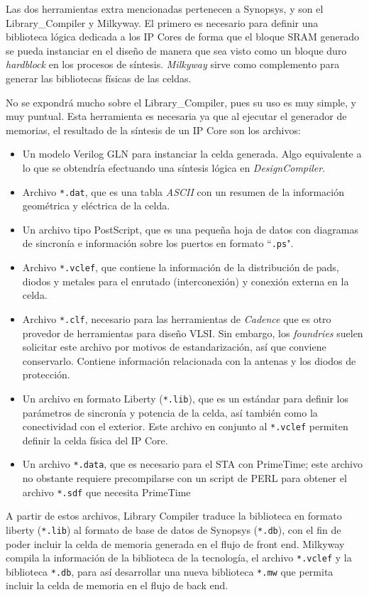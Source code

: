 Las dos herramientas extra mencionadas pertenecen a Synopsys, y son el Library\_Compiler y Milkyway. El primero es necesario para definir una biblioteca lógica dedicada a los IP Cores de forma que el bloque SRAM generado se pueda instanciar en el diseño de manera que sea visto como un bloque duro \textit{hardblock} en los procesos de síntesis. \textit{Milkyway} sirve como complemento para generar las bibliotecas físicas de las celdas.

No se expondrá mucho sobre el Library\_Compiler, pues su uso es muy simple, y muy puntual. Esta herramienta es necesaria ya que al ejecutar el generador de memorias, el resultado de la síntesis de un IP Core son los archivos:
\begin{itemize}
\item Un modelo Verilog GLN para instanciar la celda generada. Algo equivalente a lo que se obtendría efectuando una síntesis lógica en \textit{DesignCompiler}.
\item Archivo \texttt{*.dat}, que es una tabla \textit{ASCII} con un resumen de la información geométrica y eléctrica de la celda.
\item Un archivo tipo PostScript, que es una pequeña hoja de datos con diagramas de sincronía e información sobre los puertos en formato ``\texttt{.ps}".
\item Archivo \texttt{*.vclef}, que contiene la información de la distribución de pads, diodos y metales para el enrutado (interconexión) y conexión externa en la celda.
\item Archivo \texttt{*.clf}, necesario para las herramientas de \textit{Cadence} que es otro provedor de herramientas para diseño VLSI.  Sin embargo, los \textit{foundries} suelen solicitar este archivo por motivos de estandarización, así que conviene conservarlo. Contiene información relacionada con la antenas y los diodos de protección.
\item Un archivo en formato Liberty (\texttt{*.lib}), que es un estándar para definir los parámetros de sincronía y potencia de la celda, así también como la conectividad con el exterior. Este archivo en conjunto al \texttt{*.vclef} permiten definir la celda física del IP Core.
\item Un archivo \texttt{*.data}, que es necesario para el STA con PrimeTime; este archivo no obstante requiere precompilarse con un script de PERL para obtener el archivo \texttt{*.sdf} que necesita PrimeTime
\end{itemize}

A partir de estos archivos, Library Compiler traduce la biblioteca en formato liberty (\texttt{*.lib}) al formato de base de datos de Synopsys (\texttt{*.db}), con el fin de poder incluir la celda de memoria generada en el flujo de front end. Milkyway compila la información de la biblioteca de la tecnología, el archivo \texttt{*.vclef} y la biblioteca \texttt{*.db}, para así desarrollar una nueva biblioteca \texttt{*.mw} que permita incluir la celda de memoria en el flujo de back end.

